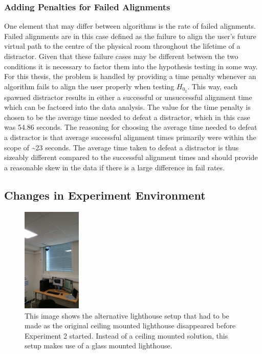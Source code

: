 \subsubsection{Adding Penalties for Failed Alignments}
One element that may differ between algorithms is the rate of failed alignments. Failed alignments are in this case defined as the failure to align the user's future virtual path to the centre of the physical room throughout the lifetime of a distractor. Given that these failure cases may be different between the two conditions it is necessary to factor them into the hypothesis testing in some way. For this thesis, the problem is handled by providing a time penalty whenever an algorithm fails to align the user properly when testing $H_{0_2}$. This way, each spawned distractor results in either a successful or unsuccessful alignment time which can be factored into the data analysis. The value for the time penalty is chosen to be the average time needed to defeat a distractor, which in this case was 54.86 seconds. The reasoning for choosing the average time needed to defeat a distractor is that average successful alignment times primarily were within the scope of \textasciitilde23 seconds. The average time taken to defeat a distractor is thus sizeably different compared to the successful alignment times and should provide a reasonable skew in the data if there is a large difference in fail rates. 


\subsection{Changes in Experiment Environment}\label{sec:ex2environmentchanges}
\begin{figure}[tbph]
    \centering
    \includegraphics[width=0.25\textwidth]{figures/images/experiment2EnvironmentChanges.jpg}
    \caption[Changes in Experiment Environment for Experiment 2]{This image shows the alternative lighthouse setup that had to be made as the original ceiling mounted lighthouse disappeared before Experiment 2 started. Instead of a ceiling mounted solution, this setup makes use of a glass mounted lighthouse.}
    \label{fig:ex2changedLighthouse}
\end{figure}

